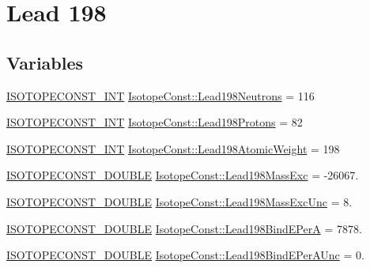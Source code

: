 \hypertarget{group___isotope_const-_lead-_pb198}{}\section{Lead 198}
\label{group___isotope_const-_lead-_pb198}
\subsection*{Variables}
\begin{DoxyCompactItemize}
\item 
\mbox{\hyperlink{group___isotope_const-_macros_ga5f18360b3e99483a35c32d789e62621c}{I\+S\+O\+T\+O\+P\+E\+C\+O\+N\+S\+T\+\_\+\+I\+NT}} \mbox{\hyperlink{group___isotope_const-_lead-_pb198_ga0ded8f6f1c1c4c4d660e18f74bad6230}{Isotope\+Const\+::\+Lead198\+Neutrons}} = 116
\item 
\mbox{\hyperlink{group___isotope_const-_macros_ga5f18360b3e99483a35c32d789e62621c}{I\+S\+O\+T\+O\+P\+E\+C\+O\+N\+S\+T\+\_\+\+I\+NT}} \mbox{\hyperlink{group___isotope_const-_lead-_pb198_gaef8ad3552057ac9f3f1d5811d7fb1d25}{Isotope\+Const\+::\+Lead198\+Protons}} = 82
\item 
\mbox{\hyperlink{group___isotope_const-_macros_ga5f18360b3e99483a35c32d789e62621c}{I\+S\+O\+T\+O\+P\+E\+C\+O\+N\+S\+T\+\_\+\+I\+NT}} \mbox{\hyperlink{group___isotope_const-_lead-_pb198_gad4754e0ca20650dd5d44c94a9a2155c2}{Isotope\+Const\+::\+Lead198\+Atomic\+Weight}} = 198
\item 
\mbox{\hyperlink{group___isotope_const-_macros_ga8f45a7272ce02c0b4c65c44636ed719a}{I\+S\+O\+T\+O\+P\+E\+C\+O\+N\+S\+T\+\_\+\+D\+O\+U\+B\+LE}} \mbox{\hyperlink{group___isotope_const-_lead-_pb198_gad629c7936866600efcfb76e1f66c5a30}{Isotope\+Const\+::\+Lead198\+Mass\+Exc}} = -\/26067.
\item 
\mbox{\hyperlink{group___isotope_const-_macros_ga8f45a7272ce02c0b4c65c44636ed719a}{I\+S\+O\+T\+O\+P\+E\+C\+O\+N\+S\+T\+\_\+\+D\+O\+U\+B\+LE}} \mbox{\hyperlink{group___isotope_const-_lead-_pb198_gad3b371dd355e170b538c1ffffdae50a7}{Isotope\+Const\+::\+Lead198\+Mass\+Exc\+Unc}} = 8.
\item 
\mbox{\hyperlink{group___isotope_const-_macros_ga8f45a7272ce02c0b4c65c44636ed719a}{I\+S\+O\+T\+O\+P\+E\+C\+O\+N\+S\+T\+\_\+\+D\+O\+U\+B\+LE}} \mbox{\hyperlink{group___isotope_const-_lead-_pb198_ga334d83502a9a12541f9a37f61acbe03c}{Isotope\+Const\+::\+Lead198\+Bind\+E\+PerA}} = 7878.
\item 
\mbox{\hyperlink{group___isotope_const-_macros_ga8f45a7272ce02c0b4c65c44636ed719a}{I\+S\+O\+T\+O\+P\+E\+C\+O\+N\+S\+T\+\_\+\+D\+O\+U\+B\+LE}} \mbox{\hyperlink{group___isotope_const-_lead-_pb198_ga70a0f8376a6bbe4b87b4c6e324198f19}{Isotope\+Const\+::\+Lead198\+Bind\+E\+Per\+A\+Unc}} = 0.

\end{DoxyCompactItemize}
